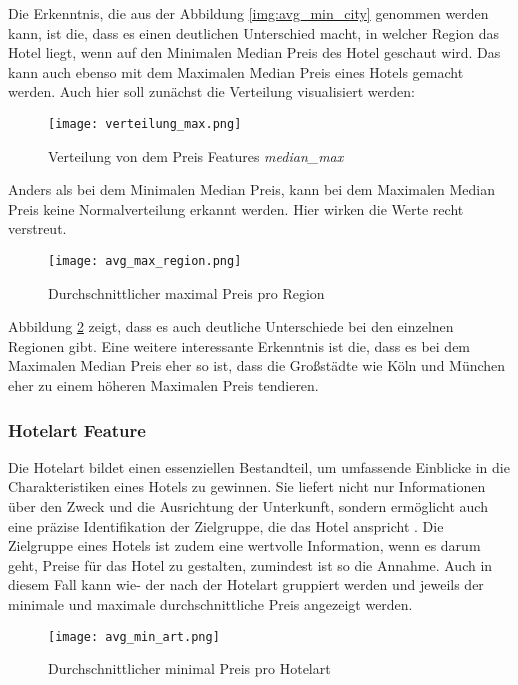Die Erkenntnis, die aus der Abbildung \ref{img:avg_min_city} genommen werden kann, ist die, dass es einen deutlichen Unterschied macht, in welcher Region das Hotel liegt, wenn auf den Minimalen Median Preis des Hotel geschaut wird. Das kann auch ebenso mit dem Maximalen Median Preis eines Hotels gemacht werden. Auch hier soll zunächst die Verteilung visualisiert werden:

\begin{figure}[h]
    \centering
    \texttt{[image: verteilung\_max.png]}
    \caption[Verteilung von dem Preis Features \emph{median\_max}]{Verteilung von dem Preis Features \emph{median\_max}}
    \label{img:verteilung_max}
\end{figure}

Anders als bei dem Minimalen Median Preis, kann bei dem Maximalen Median Preis keine Normalverteilung erkannt werden. Hier wirken die Werte recht verstreut.

\begin{figure}[h]
    \centering
    \texttt{[image: avg\_max\_region.png]}
    \caption[Durchschnittlicher maximal Preis pro Region]{Durchschnittlicher maximal Preis pro Region}
    \label{img:avg_max_city}
\end{figure}

Abbildung \ref{img:avg_max_city} zeigt, dass es auch deutliche Unterschiede bei den einzelnen Regionen gibt. Eine weitere interessante Erkenntnis ist die, dass es bei dem Maximalen Median Preis eher so ist, dass die Großstädte wie Köln und München eher zu einem höheren Maximalen Preis tendieren.

\subsubsection{Hotelart Feature}
Die Hotelart bildet einen essenziellen Bestandteil, um umfassende Einblicke in die Charakteristiken eines Hotels zu gewinnen. Sie liefert nicht nur Informationen über den Zweck und die Ausrichtung der Unterkunft, sondern ermöglicht auch eine präzise Identifikation der Zielgruppe, die das Hotel anspricht \cite{User.20.01.2024}. Die Zielgruppe eines Hotels ist zudem eine wertvolle Information, wenn es darum geht, Preise für das Hotel zu gestalten, zumindest ist so die Annahme. Auch in diesem Fall kann wie- der nach der Hotelart gruppiert werden und jeweils der minimale und maximale durchschnittliche Preis angezeigt werden.

\begin{figure}[h]
    \centering
    \texttt{[image: avg\_min\_art.png]}
    \caption[Durchschnittlicher minimal Preis pro Hotelart]{Durchschnittlicher minimal Preis pro Hotelart}
    \label{img:avg_min_art}
\end{figure}

